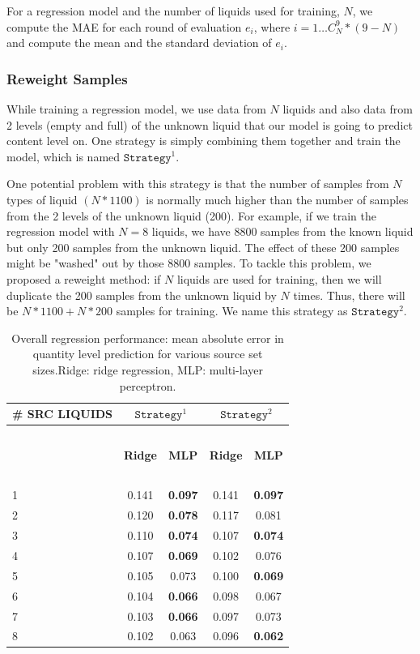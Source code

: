 \documentclass{article} %
\begin{document}
For a regression model and the number of liquids used for training, $N$, we compute the MAE for each round of evaluation $e_i$, where $i= 1\dots C_N^9 * (9-N)$ and compute the mean and the standard deviation of $e_i$.

\subsubsection{Reweight Samples}
While training a regression model, we use data from $N$ liquids and also data from 2 levels (empty and full) of the unknown liquid that our model is going to predict content level on. One strategy is simply combining them together and train the model, which is named $\mathtt{Strategy}^1$. 

One potential problem with this strategy is that the number of samples from $N$ types of liquid $(N * 1100)$ is normally much higher than the number of samples from the 2 levels of the unknown liquid (200). For example, if we train the regression model with $N = 8$ liquids, we have 8800 samples from the known liquid but only 200 samples from the unknown liquid. The effect of these 200 samples might be "washed" out by those 8800 samples. To tackle this problem, we proposed a reweight method: if $N$ liquids are used for training, then we will duplicate the 200 samples from the unknown liquid by $N$ times. Thus, there will be $N * 1100 + N * 200$ samples for training. We name this strategy as $\mathtt{Strategy}^2$.

\begin{table}[t]
\caption{Overall regression performance: mean absolute error in quantity level prediction for various source set sizes.Ridge: ridge regression, MLP: multi-layer perceptron.}
\label{table:result}
\begin{center}
\begin{tabular}{ l | c | c | c | c}
\textbf{\# SRC LIQUIDS} & \multicolumn{2}{c|}{$\mathtt{Strategy}^1$} & \multicolumn{2}{c}{$\mathtt{Strategy}^2$} \\ \hline
~ & ~ & ~ & ~ & ~\\
~ & \textbf{Ridge} & \textbf{MLP} & \textbf{Ridge} & \textbf{MLP}\\ \hline
~ & ~ & ~ & ~ & ~\\
1 & 0.141 & \textbf{0.097} & 0.141 & \textbf{0.097}\\
2 & 0.120 & \textbf{0.078} & 0.117 & 0.081\\
3 & 0.110 & \textbf{0.074} & 0.107 & \textbf{0.074}\\
4 & 0.107 & \textbf{0.069} & 0.102 & 0.076\\
5 & 0.105 & 0.073 & 0.100 & \textbf{0.069}\\
6 & 0.104 & \textbf{0.066} & 0.098 & 0.067\\
7 & 0.103 & \textbf{0.066} & 0.097 & 0.073\\
8 & 0.102 & 0.063 & 0.096 & \textbf{0.062}\\
\end{tabular}
\end{center}
\end{table}
\end{document}
